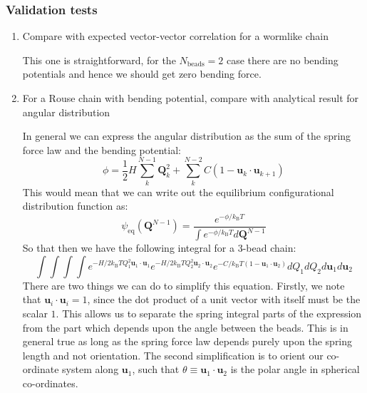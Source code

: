 \documentclass{article}
\begin{document}
\subsubsection{Validation tests}
\begin{enumerate}

    \item Compare with expected vector-vector correlation for a wormlike chain
    
\noindent This one is straightforward, for the $N_\mathrm{beads} = 2$ case there are no bending potentials and hence we should get zero bending force.

    \item For a Rouse chain with bending potential, compare with analytical result for angular distribution
    
\noindent In general we can express the angular distribution as the sum of the spring force law and the bending potential:
\begin{equation}
    \phi = \frac{1}{2} H \sum^{N-1}_{k} \bm{Q}_k^2 + \sum^{N-2}_k C ( 1 - \bm{u}_k \cdot \bm{u}_{k+1} )
\end{equation}
This would mean that we can write out the equilibrium configurational distribution function as:
\begin{equation}
    \psi_{\mathrm{eq}}(\bm{Q}^{N-1}) = \frac{e^{-\phi/k_\mathrm{B} T}}{\int e^{-\phi/k_\mathrm{B} T} d\bm{Q}^{N-1} }
\end{equation}
So that then we have the following integral for a 3-bead chain:
\begin{equation}
    \int \int \int \int e^{- H/2k_\mathrm{B} T Q_1^2 \bm{u}_1 \cdot \bm{u}_1} e^{- H/2k_\mathrm{B} T Q_2^2 \bm{u}_2 \cdot \bm{u}_2} e^{-C/k_\mathrm{B} T (1 - \bm{u}_1 \cdot \bm{u}_2)} dQ_1 dQ_2 d\bm{u}_1 d\bm{u}_2
\end{equation}
There are two things we can do to simplify this equation. 
Firstly, we note that $\bm{u}_i \cdot \bm{u}_i = 1$, since the dot product of a unit vector with itself must be the scalar $1$. 
This allows us to separate the spring integral parts of the expression from the part which depends upon the angle between the beads. 
This is in general true as long as the spring force law depends purely upon the spring length and not orientation. 
The second simplification is to orient our co-ordinate system along $\bm{u}_1$, such that $\theta \equiv \bm{u}_1 \cdot \bm{u}_2$ is the polar angle in spherical co-ordinates. 

\end{enumerate}
\end{document}
